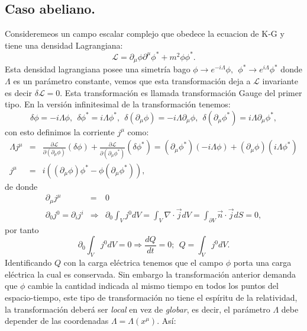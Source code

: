 \subsection{Caso abeliano.}
Consideremeos un campo escalar complejo que obedece la ecuacion de K-G y tiene una densidad Lagrangiana:
\begin{equation}
\mathcal{L}=\partial_{\mu}\phi\partial^{\mu}\phi^{*}+m^{2}\phi\phi^{*}.
\end{equation}
Esta densidad lagrangiana posee una simetría bago $\phi\to e^{-i\Lambda}\phi,\ \ \phi^{*}\to e^{i\Lambda}\phi^{*}$ donde $\Lambda$ es un parámetro constante, vemos que esta transformación deja a $\mathcal{L}$ invariante es decir $\delta\mathcal{L}=0$. Esta transformación es llamada transformación Gauge del primer tipo. En la versión infinitesimal de la transformación tenemos:
\begin{equation}
\delta\phi=-i\Lambda\phi,\ \ \delta\phi^{*}=i\Lambda\phi^{*},\ \ \delta(\partial_{\mu}\phi)=-i\Lambda\partial_{\mu}\phi,\ \ \delta(\partial_{\mu}\phi^{*})=i\Lambda\partial_{\mu}\phi^{*},
\end{equation}
con esto definimos la corriente $j^{\mu}$ como:
\begin{eqnarray}
\nonumber \Lambda j^{\mu}&=&\frac{\partial\mathcal{L}}{\partial(\partial_{\mu}\phi)}(\delta\phi)+\frac{\partial\mathcal{L}}{\partial(\partial_{\mu}\phi^{*})}(\delta\phi^{*})=(\partial_{\mu}\phi^{*})(-i\Lambda\phi)+(\partial_{\mu}\phi)(i\Lambda\phi^{*})\\
j^\mu &=& i((\partial_{\mu}\phi)\phi^{*}-\phi(\partial_{\mu}\phi^{*})),
\end{eqnarray}
de donde
\begin{eqnarray}
\partial_\mu j^\mu &=& 0\\
\partial_{0}j^{0}=\partial_{i}j^{i}&\Rightarrow &\partial_{0}\int_{V}j^{0}dV=\int_{V}\nabla\cdot\vec{j}dV=\int_{\partial V}\vec{n}\cdot\vec{j}dS=0,
\end{eqnarray} 
por tanto
\begin{equation}
\partial_{0}\int_{V}j^{0}dV=0\Rightarrow\frac{dQ}{dt}=0;\ \ Q=\int_{V}j^{0}dV.
\end{equation}
Identificando $Q$ con la carga eléctrica tenemos que el campo $\phi$ porta una carga eléctrica la cual es conservada. Sin embargo la transformación anterior demanda que $\phi$ cambie la cantidad indicada al mismo tiempo en todos los puntos del espacio-tiempo, este tipo de transformación no tiene el espíritu de la relatividad, la transformación deberá ser \textit{local} en vez de \textit{globar}, es decir, el parámetro $\Lambda$ debe depender de las coordenadas $\Lambda=\Lambda(x^\mu)$. Así:
